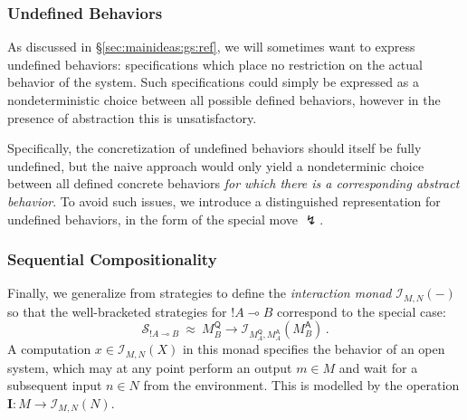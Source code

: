 \documentclass[acmsmall,timestamp,review,anonymous]{acmart}
\newcommand{\kw}[1]{\ensuremath{ \mathsf{#1} }}
\begin{document}
\subsubsection{Undefined Behaviors} %

As discussed in \S\ref{sec:mainideas:gs:ref},
we will sometimes want to express undefined behaviors:
specifications which place no restriction on
the actual behavior of the system.
Such specifications could simply be expressed
as a nondeterministic choice between all possible defined behaviors,
however in the presence of abstraction this is unsatisfactory.

Specifically,
the concretization of undefined behaviors
should itself be fully undefined,
but the naive approach would only yield
a nondeterminic choice between all defined concrete behaviors
\emph{for which there is a corresponding abstract behavior}.
To avoid such issues,
we introduce a distinguished representation for undefined behaviors,
in the form of the special move $\lightning$.


\subsubsection{Sequential Compositionality} %

Finally,
we generalize from strategies to
define the \emph{interaction monad} $\mathcal{I}_{M,N}(-)$
so that the well-bracketed strategies for $!A \multimap B$
correspond to the special case:
\[
    \mathcal{S}_{!A \multimap B} \: \approx \:
    M_B^\kw{Q} \rightarrow \mathcal{I}_{M_A^\kw{Q},M_A^\kw{A}}(M_B^\kw{A}) \,.
\]
A computation $x \in \mathcal{I}_{M,N}(X)$ in this monad
specifies the behavior of an open system,
which may at any point perform an output $m \in M$ and
wait for a subsequent input $n \in N$ from the environment.
This is modelled by the operation
$\mathbf{I} : M \rightarrow \mathcal{I}_{M,N}(N)$.

%
\end{document}
